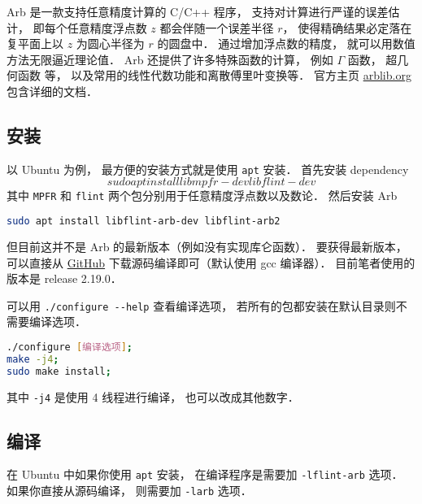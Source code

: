 

Arb 是一款支持任意精度计算的 C/C++ 程序， 支持对计算进行严谨的误差估计， 即每个任意精度浮点数 $z$ 都会伴随一个误差半径 $r$， 使得精确结果必定落在复平面上以 $z$ 为圆心半径为 $r$ 的圆盘中． 通过增加浮点数的精度， 就可以用数值方法无限逼近理论值． Arb 还提供了许多特殊函数的计算， 例如 $\Gamma$ 函数， 超几何函数 等， 以及常用的线性代数功能和离散傅里叶变换等． 官方主页 \href{https://arblib.org/}{arblib.org} 包含详细的文档．

\subsection{安装}
以 Ubuntu 为例， 最方便的安装方式就是使用 \verb|apt| 安装． 首先安装 dependency
\begin{equation}
sudo apt install libmpfr-dev libflint-dev
\end{equation}
其中 \verb|MPFR| 和 \verb|flint| 两个包分别用于任意精度浮点数以及数论． 然后安装 Arb
\begin{lstlisting}[language=bash]
sudo apt install libflint-arb-dev libflint-arb2
\end{lstlisting}

但目前这并不是 Arb 的最新版本（例如没有实现库仑函数）． 要获得最新版本， 可以直接从 \href{https://github.com/fredrik-johansson/arb/}{GitHub} 下载源码编译即可（默认使用 gcc 编译器）． 目前笔者使用的版本是 release 2.19.0．

可以用 \verb|./configure --help| 查看编译选项， 若所有的包都安装在默认目录则不需要编译选项．
\begin{lstlisting}[language=bash]
./configure [编译选项];
make -j4;
sudo make install;
\end{lstlisting}
其中 \verb|-j4| 是使用 4 线程进行编译， 也可以改成其他数字．

\subsection{编译}
在 Ubuntu 中如果你使用 \verb|apt| 安装， 在编译程序是需要加 \verb|-lflint-arb| 选项． 如果你直接从源码编译， 则需要加 \verb|-larb| 选项．

